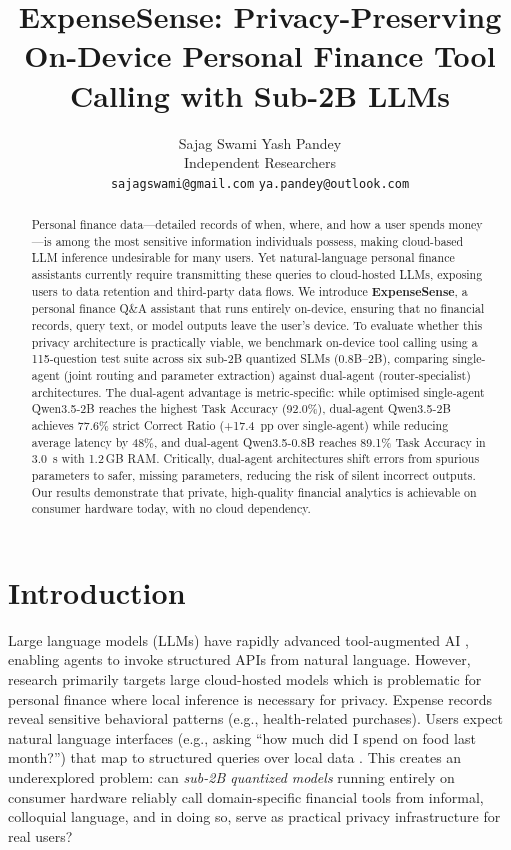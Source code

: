 \documentclass[11pt,twocolumn]{article}
\title{ExpenseSense: Privacy-Preserving On-Device Personal Finance Tool Calling with Sub-2B LLMs}
\author{Sajag Swami \qquad Yash Pandey \\
  Independent Researchers \\
  \texttt{sajagswami@gmail.com} \qquad \texttt{ya.pandey@outlook.com}}
\begin{document}
\maketitle

\begin{abstract}
Personal finance data---detailed records of when, where, and how a user spends money---is among the most sensitive information individuals possess, making cloud-based LLM inference undesirable for many users.
Yet natural-language personal finance assistants currently require transmitting these queries to cloud-hosted
LLMs, exposing users to data retention and third-party data flows.
We introduce \textbf{ExpenseSense}, a personal finance Q\&A assistant that runs entirely on-device, ensuring that no financial
records, query text, or model outputs leave the user's device.
To evaluate whether this privacy architecture is practically viable,
we benchmark on-device tool calling using a 115-question test suite
across six sub-2B quantized SLMs (0.8B--2B), comparing single-agent
(joint routing and parameter extraction) against dual-agent
(router-specialist) architectures.
The dual-agent advantage is metric-specific:
while optimised single-agent Qwen3.5-2B reaches the highest Task
Accuracy (92.0\%), dual-agent Qwen3.5-2B achieves 77.6\% strict
Correct Ratio (+17.4~pp over single-agent) while reducing average
latency by 48\%, and dual-agent Qwen3.5-0.8B reaches 89.1\% Task
Accuracy in 3.0~s with 1.2\,GB RAM.
Critically, dual-agent architectures shift errors from spurious
parameters to safer, missing parameters, reducing the risk of silent
incorrect outputs.
Our results demonstrate that private, high-quality financial analytics
is achievable on consumer hardware today, with no cloud dependency.
\end{abstract}

\section{Introduction}

Large language models (LLMs) have rapidly advanced tool-augmented AI
\citep{schick2024toolformer, patil2023gorilla, qin2023toolllm},
enabling agents to invoke structured APIs from natural language.
However, research primarily targets large cloud-hosted models which
is problematic for personal finance where local inference is necessary
for privacy.
Expense records reveal sensitive behavioral patterns (e.g., health-related purchases). 
Users expect natural language interfaces (e.g., asking ``how much did I spend on
food last month?'') that map to structured queries over local data
\citep{li2024personal}.
This creates an underexplored problem: can \emph{sub-2B quantized
models} running entirely on consumer hardware reliably call
domain-specific financial tools from informal, colloquial language,
and in doing so, serve as practical privacy infrastructure for real
users?
\end{document}
